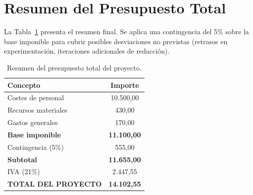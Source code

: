 \section{Resumen del Presupuesto Total}

La Tabla~\ref{tab:presupuesto_total} presenta el resumen final. Se aplica una contingencia del 5\% sobre la base imponible para cubrir posibles desviaciones no previstas (retrasos en experimentación, iteraciones adicionales de redacción).

\begin{table}[htbp]
\centering
\small
\begin{tabular}{@{}lc@{}}
\toprule
\textbf{Concepto} & \textbf{Importe} \\
\midrule
Costes de personal     & 10.500,00 \texteuro{} \\
Recursos materiales    &   430,00 \texteuro{} \\
Gastos generales       &   170,00 \texteuro{} \\
\midrule
\textbf{Base imponible} & \textbf{11.100,00 \texteuro{}} \\
Contingencia (5\%)     &   555,00 \texteuro{} \\
\midrule
\textbf{Subtotal}      & \textbf{11.655,00 \texteuro{}} \\
IVA (21\%)             & 2.447,55 \texteuro{} \\
\midrule
\textbf{TOTAL DEL PROYECTO} & \textbf{14.102,55 \texteuro{}} \\
\bottomrule
\end{tabular}
\caption{Resumen del presupuesto total del proyecto.}
\label{tab:presupuesto_total}
\end{table}
